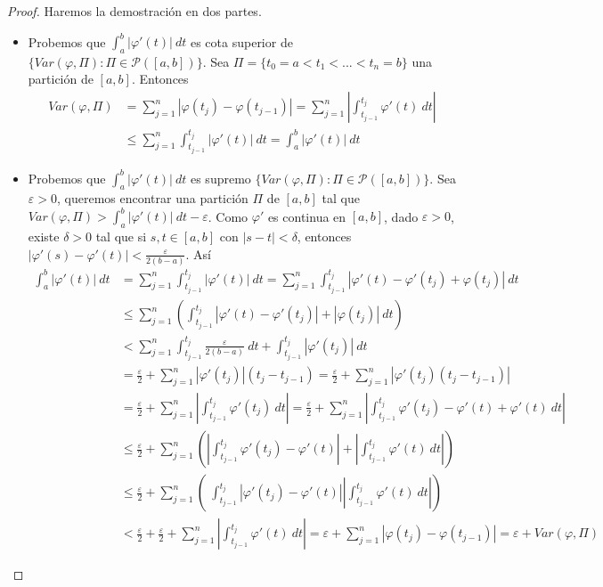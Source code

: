 \begin{proof}
Haremos la demostración en dos partes.
\begin{itemize}
    \item Probemos que $\int_{a}^{b}{\left|\varphi'(t)\right| \ dt}$ es cota superior de $\{Var(\varphi, \Pi) : \Pi \in \mathcal{P}([a,b])\}$. Sea $\Pi = \{t_0 = a < t_1 <... < t_n = b\}$ una partición de $[a,b]$. Entonces
    \begin{align*}
        Var(\varphi, \Pi) &= \sum_{j=1}^{n}{|\varphi(t_j) - \varphi(t_{j-1})|} = \sum_{j=1}^{n}{\left| \int_{t_{j-1}}^{t_j}{\varphi'(t)} \ dt \right|} \\
        & \leq \sum_{j=1}^{n}{\int_{t_{j-1}}^{t_j}{|\varphi'(t)|} \ dt } = \int_{a}^{b}{\left|\varphi'(t)\right| \ dt}
    \end{align*}
    \item Probemos que $\int_{a}^{b}{\left|\varphi'(t)\right| \ dt}$ es supremo $\{Var(\varphi, \Pi) : \Pi \in \mathcal{P}([a,b])\}$. Sea $\varepsilon > 0$, queremos encontrar una partición $\Pi$ de $[a,b]$ tal que $Var(\varphi, \Pi) > \int_{a}^{b}{|\varphi'(t)| \ dt} - \varepsilon$. Como $\varphi'$ es continua en $[a,b]$, dado $\varepsilon > 0$, existe $\delta > 0$ tal que si $s,t \in [a,b]$ con $|s-t| < \delta$, entonces $|\varphi'(s) - \varphi'(t)| < \frac{\varepsilon}{2(b-a)}$. Así
    \begin{align*}
        \int_{a}^{b}{\left|\varphi'(t)\right| \ dt} &= \sum_{j=1}^{n}{\int_{t_{j-1}}^{t_j}{|\varphi'(t)|} \ dt } =  \sum_{j=1}^{n}{\int_{t_{j-1}}^{t_j}{|\varphi'(t) -\varphi'(t_j) + \varphi(t_j)|} \ dt } \\
        & \leq \sum_{j=1}^{n}\left({\int_{t_{j-1}}^{t_j}{|\varphi'(t) -\varphi'(t_j)| + |\varphi(t_j)|} \ dt }\right) \\
        &< \sum_{j=1}^{n}{\int_{t_{j-1}}^{t_j}{\frac{\varepsilon}{2(b-a)}}\ dt + \int_{t_{j-1}}^{t_j}{|\varphi'(t_j)| \ dt}} \\
        &= \frac{\varepsilon}{2} + \sum_{j=1}^{n}{|\varphi'(t_j)|(t_j - t_{j-1})} = \frac{\varepsilon}{2} + \sum_{j=1}^{n}{|\varphi'(t_j)(t_j - t_{j-1})|} \\
        &= \frac{\varepsilon}{2} + \sum_{j=1}^{n}{\left| \int_{t_{j-1}}^{t_j}{\varphi'(t_j)} \ dt \right|} = \frac{\varepsilon}{2} + \sum_{j=1}^{n}{\left| \int_{t_{j-1}}^{t_j}{\varphi'(t_j) - \varphi'(t) + \varphi'(t)} \ dt \right|} \\
        & \leq \frac{\varepsilon}{2} + \sum_{j=1}^{n} \left( \left| \int_{t_{j-1}}^{t_j}{\varphi'(t_j) - \varphi'(t) }\right| + \left|\int_{t_{j-1}}^{t_j}{\varphi'(t) \ dt} \right|\right) \\
        & \leq \frac{\varepsilon}{2} + \sum_{j=1}^{n} \left( \ \int_{t_{j-1}}^{t_j}{|\varphi'(t_j) - \varphi'(t) |} \left|\int_{t_{j-1}}^{t_j}{\varphi'(t) \ dt} \right|\right) \\
        & < \frac{\varepsilon}{2} + \frac{\varepsilon}{2} + \sum_{j=1}^{n}{\left|\int_{t_{j-1}}^{t_j}{\varphi'(t) \ dt} \right|} = \varepsilon + \sum_{j=1}^{n}{|\varphi(t_j) - \varphi(t_{j-1})|} = \varepsilon + Var(\varphi, \Pi)
    \end{align*}
\end{itemize}
\end{proof}

